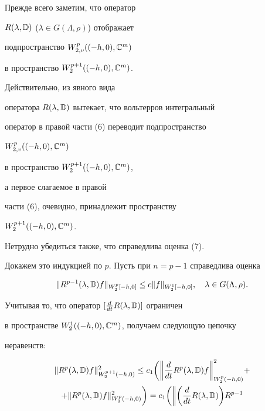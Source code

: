 \begin{pf} 


Прежде всего заметим, что оператор 


$R(\lambda,\Bbb D)$ ($\lambda\in G(\Lambda,\rho)$) отображает 


подпространство $W^p_{2,v}((-h,0),\Bbb C^m)$ 


в пространство $W^{p+1}_2((-h,0),\Bbb C^m)$. 


Действительно, из явного вида 


оператора $R(\lambda,\Bbb D)$ вытекает, что вольтерров интегральный 


оператор в правой части (6) переводит подпространство 


$W^p_{2,v}((-h,0),\Bbb C^m)$ 


в пространство $W^{p+1}_2((-h,0),\Bbb C^m)$, 


а первое слагаемое в правой 


части (6), очевидно, принадлежит пространству 


$W^{p+1}_{2}((-h,0),\Bbb C^m)$. 


 


Нетрудно убедиться также, что справедлива оценка (7). 


Докажем это индукцией по $p$. Пусть при $n=p-1$ справедлива оценка 


\begin{equation} 


\|R^{p-1}(\lambda,\Bbb D)f\|_{W^p_2[-h,0]}\le c 


\|f\|_{W^1_2[-h,0]},\quad \lambda\in G(\Lambda,\rho). 


\end{equation} 


Учитывая то, что оператор $[\frac{d}{d t}R(\lambda,\Bbb D)]$ ограничен 


в пространстве $W^1_2((-h,0),\Bbb C^m)$, получаем следующую цепочку 


неравенств:


\begin{multline} 


\|R^p(\lambda,\Bbb D)f\|^2_{W^{p+1}_2(-h,0)}\le c_1\bigg(\bigg\| 


\frac{d}{d t}R^p(\lambda,\Bbb D)f\bigg\|^2_{W^p_2(-h,0)}+ \\ 


% 


+\|R^p(\lambda,\Bbb D)f\|^2_{W^p_2(-h,0)}\bigg)=c_1\bigg(\bigg\| 


\bigg(\frac{d}{d t}R(\lambda,\Bbb D)\bigg)R^{p-1} 



\end{multline}
\end{pf}

